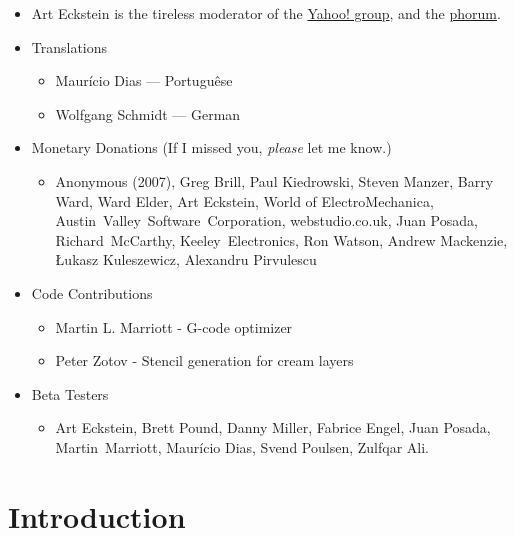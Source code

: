 \documentclass[11pt]{book}
\begin{document}
\begin{itemize}
	\item Art Eckstein is the tireless moderator of the \href{http://groups.yahoo.com/group/pcb-gcode}{Yahoo! group}, and the \href{http://www.pcbgcode.org}{phorum}.
	\item Translations
	\begin{itemize}
		\item Maur\'icio Dias --- Portugu\^ese
		\item Wolfgang Schmidt --- German
	\end{itemize}
	\item{Monetary Donations (If I missed you, \emph{please} let me know.) }
	\begin{itemize}
    	\raggedright
		\item Anonymous (2007), Greg Brill, Paul Kiedrowski, Steven Manzer, Barry Ward, Ward Elder, Art Eckstein, World of ElectroMechanica, Austin~Valley~Software~Corporation, webstudio.co.uk, Juan Posada, Richard~McCarthy, Keeley~Electronics, Ron Watson, Andrew Mackenzie, {\L}ukasz Kuleszewicz, Alexandru Pirvulescu
	\end{itemize}
	\item{Code Contributions}
	    \begin{itemize}
	    \small
	    \item Martin L. Marriott - G-code optimizer
	    \item Peter Zotov - Stencil generation for cream layers
	    \end{itemize}
	\item{Beta Testers}
	\begin{itemize}
    	\raggedright
	    \item Art Eckstein, Brett Pound, Danny Miller, Fabrice Engel, Juan Posada, Martin~Marriott, Maur\'icio Dias, Svend Poulsen, Zulfqar Ali.
	\end{itemize}
\end{itemize}


\tableofcontents

\listoffigures

\listoftables

\mainmatter

%
\chapter{Introduction}\label{chp:Introduction}
%
\end{document}
